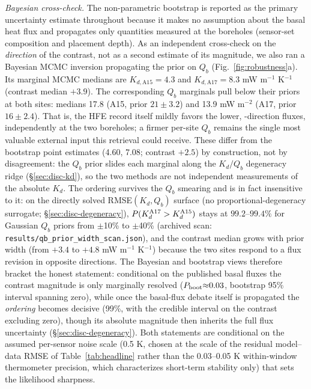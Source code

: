 \documentclass[11pt]{article}
\begin{document}
\emph{Bayesian cross-check.} The non-parametric bootstrap is reported as
the primary uncertainty estimate throughout because it makes no assumption
about the basal heat flux and propagates only quantities measured at the
boreholes (sensor-set composition and placement depth). As an independent
cross-check on the \emph{direction} of the contrast, not as a second
estimate of its magnitude, we also ran a Bayesian MCMC inversion
\citep{foreman_mackey2013emcee} propagating the
\citet{saito2007,nagihara2018} prior on $Q_b$
(Fig.~\ref{fig:robustness}a). Its marginal MCMC medians
are $K_{d,\mathrm{A15}}=4.3$ and
$K_{d,\mathrm{A17}}=8.3$
mW m$^{-1}$ K$^{-1}$ (contrast median $+3.9$).
The corresponding $Q_b$ marginals pull below their priors at both
sites: medians 17.8 (A15, prior $21\pm3.2$) and 13.9 mW m$^{-2}$
(A17, prior $16\pm2.4$). That is, the HFE record itself mildly favors
the lower, \citet{saito2007}-direction fluxes, independently at the two
boreholes; a firmer per-site $Q_b$ remains the single most valuable
external input this retrieval could receive. These
differ from the
bootstrap point estimates (4.60,
7.08; contrast $+2.5$) by construction,
not by disagreement: the $Q_b$ prior slides each marginal along the
$K_d/Q_b$ degeneracy ridge (\S\ref{sec:disc-kd}), so the two methods are
not independent measurements of the absolute $K_d$. The ordering survives
the $Q_b$ smearing and is in fact insensitive to it: on the directly solved
RMSE$(K_d,Q_b)$ surface (no proportional-degeneracy surrogate;
\S\ref{sec:disc-degeneracy}), $P(K_d^{\rm A17}>K_d^{\rm A15})$ stays at
$99.2$--$99.4\%$ for Gaussian $Q_b$ priors from $\pm$10\% to
$\pm$40\% (archived scan: \texttt{results/qb\_prior\_width\_scan.json}),
and the contrast median grows with prior width (from
$+3.4$ to $+4.8$ mW m$^{-1}$ K$^{-1}$) because the two sites respond to a
flux revision in opposite directions. The Bayesian and bootstrap views
therefore bracket the honest statement: conditional on the published
basal fluxes the contrast magnitude is only marginally resolved
($P_{\rm boot}{\approx}0.03$, bootstrap 95\% interval spanning zero), while once the
basal-flux debate itself is propagated the \emph{ordering} becomes
decisive (99\%, with the credible interval on the contrast excluding
zero), though its absolute magnitude then inherits the full flux
uncertainty (\S\ref{sec:disc-degeneracy}). Both statements are
conditional on the assumed per-sensor noise scale (0.5 K, chosen at the
scale of the residual model--data RMSE of Table~\ref{tab:headline}
rather than the 0.03--0.05 K within-window thermometer precision, which
characterizes short-term stability only) that sets the
likelihood sharpness.%
\end{document}

